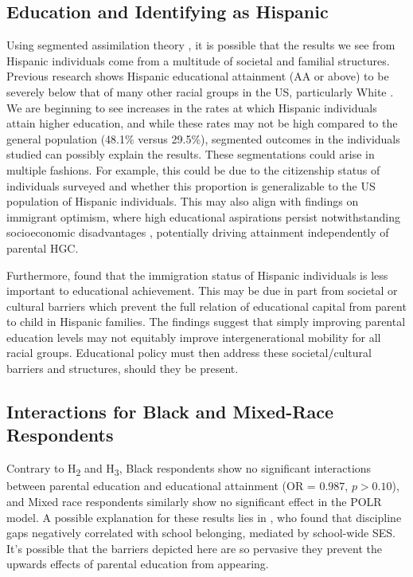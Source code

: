 \documentclass[jou,12pt,floatsintext]{apa7}
\begin{document}
\subsection{Education and Identifying as Hispanic}

Using segmented assimilation theory \parencite{portes_new_1993}, it is possible that the results we see from Hispanic individuals come from a multitude of societal and familial structures. Previous research shows Hispanic educational attainment (AA or above) to be severely below that of many other racial groups in the US, particularly White \parencite{kim_race_2024}. We are beginning to see increases in the rates at which Hispanic individuals attain higher education, and while these rates may not be high compared to the general population (48.1\% versus 29.5\%), segmented outcomes in the individuals studied can possibly explain the results. These segmentations could arise in multiple fashions. For example, this could be due to the citizenship status of individuals surveyed and whether this proportion is generalizable to the US population of Hispanic individuals. This may also align with findings on immigrant optimism, where high educational aspirations persist notwithstanding socioeconomic disadvantages \parencite{kaoOptimismAchievementEducational2022}, potentially driving attainment independently of parental HGC.

Furthermore, \textcite{kaoOptimismAchievementEducational2022} found that the immigration status of Hispanic individuals is less important to educational achievement. This may be due in part from societal or cultural barriers which prevent the full relation of educational capital from parent to child in Hispanic families. The findings suggest that simply improving parental education levels may not equitably improve intergenerational mobility for all racial groups. Educational policy must then address these societal/cultural barriers and structures, should they be present.

\subsection{Interactions for Black and Mixed-Race Respondents}

Contrary to H\textsubscript{2} and H\textsubscript{3}, Black respondents show no significant interactions between parental education and educational attainment (OR = $0.987$, $p > 0.10$), and Mixed race respondents similarly show no significant effect in the POLR model. A possible explanation for these results lies in \textcite{bottiani_multilevel_2017}, who found that discipline gaps negatively correlated with school belonging, mediated by school-wide SES. It's possible that the barriers depicted here are so pervasive they prevent the upwards effects of parental education from appearing.
\end{document}
